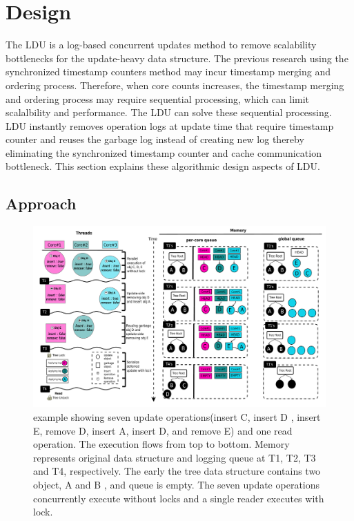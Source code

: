 \section{Design}


The LDU is a log-based concurrent updates method to remove scalability
bottlenecks for the update-heavy data structure.
The previous research using the synchronized timestamp counters method may incur
timestamp merging and ordering process.
Therefore, when core counts increases, the timestamp merging and ordering
process may require sequential processing, which can limit scalalbility and
performance.
The LDU can solve these sequential processing.
LDU instantly removes operation logs at update time that require timestamp
counter and reuses the garbage log instead of creating new log
thereby eliminating the synchronized timestamp counter and cache communication
bottleneck.
This section explains these algorithmic design aspects of LDU.

\subsection{Approach}

\begin{figure}[tb]
  \begin{center}
     \includegraphics[width=1.0\textwidth,height=0.4\textheight]{fig/basic_gldu}
  \end{center}
  \caption{ example showing seven update operations(insert C, insert D ,
  insert E, remove D, insert A, insert D, and remove E) and one read
  operation. The execution flows from top to bottom.
  Memory represents original data structure and logging queue at T1, T2, T3 and T4, respectively. The early
  the tree data structure contains two object, A and B , and queue is empty.
  The seven update operations concurrently execute without locks and a single
  reader executes with lock.}
  \label{fig:basic}
\end{figure}

